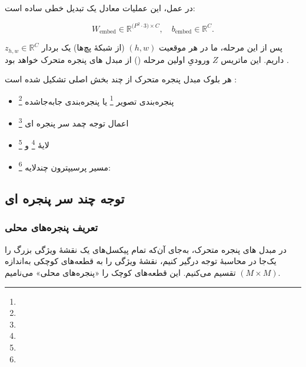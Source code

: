 در عمل، این عملیات معادل یک تبدیل خطی ساده است:

\[
W_{\text{embed}} \in \mathbb{R}^{\bigl(P^2 \cdot 3\bigr) \times C},
\quad
b_{\text{embed}} \in \mathbb{R}^{C}.
\]

پس از این مرحله، ما در هر موقعیت \((h, w)\) (از شبکهٔ پچ‌ها) یک بردار 
\(\displaystyle z_{h,w} \in \mathbb{R}^{C}\) داریم. این ماتریس \(\displaystyle Z\) 
ورودیِ اولین مرحله () از مبدل های پنجره متحرک خواهد بود \cite{liu2021swintransformer}.

هر بلوک مبدل پنجره متحرک از چند بخش اصلی تشکیل شده است \cite{liu2021swintransformer}:

\begin{itemize}
	\item پنجره‌بندی تصویر \footnote{} 
	یا پنجره‌بندی جابه‌جاشده \footnote{}
	\item اعمال توجه چمد سر پنجره ای \footnote{}
	\item لایهٔ \footnote{} و \footnote{}
	\item مسیر پرسیپترون چندلایه \footnote{}:
\end{itemize}




\subsection{توجه چند سر پنجره ای}

\subsubsection{تعریف پنجره‌های محلی}

در مبدل های پنجره متحرک، به‌جای آن‌که تمام پیکسل‌های یک نقشهٔ ویژگی بزرگ را یک‌جا 
در محاسبهٔ توجه  درگیر کنیم، نقشهٔ ویژگی را به قطعه‌های کوچکی به‌اندازه
\(\displaystyle (M \times M)\) تقسیم می‌کنیم. این قطعه‌های کوچک را 
«پنجره‌های محلی» می‌نامیم.

